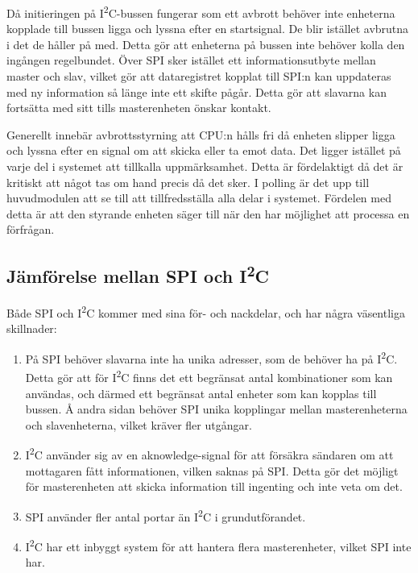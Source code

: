 \documentclass[11pt]{article}
\begin{document}
\begin{flushleft}



Då initieringen på I\textsuperscript{2}C-bussen fungerar som ett avbrott behöver inte enheterna kopplade till bussen ligga och lyssna efter en startsignal. De blir istället avbrutna i det de håller på med.\cite{guideI2C} Detta gör att enheterna på bussen inte behöver kolla den ingången regelbundet. Över SPI sker istället ett informationsutbyte mellan master och slav, vilket gör att dataregistret kopplat till SPI:n kan uppdateras med ny information så länge inte ett skifte pågår. Detta gör att slavarna kan fortsätta med sitt tills masterenheten önskar kontakt. \cite{ATMega16}

Generellt innebär avbrottsstyrning att CPU:n hålls fri då enheten slipper ligga och lyssna efter en signal om att skicka eller ta emot data. Det ligger istället på varje del i systemet att tillkalla uppmärksamhet. Detta är fördelaktigt då det är kritiskt att något tas om hand precis då det sker. I polling är det upp till huvudmodulen att se till att tillfredsställa alla delar i systemet. Fördelen med detta är att den styrande enheten säger till när den har möjlighet att processa en förfrågan. \cite{interruptPoll}

\subsection{Jämförelse mellan SPI och I\textsuperscript{2}C}
Både SPI och I\textsuperscript{2}C kommer med sina för- och nackdelar, och har några väsentliga skillnader:

\begin{enumerate}
	\item På SPI behöver slavarna inte ha unika adresser, som de behöver ha på I\textsuperscript{2}C. Detta gör att för I\textsuperscript{2}C finns det ett begränsat antal kombinationer som kan användas, och därmed ett begränsat antal enheter som kan kopplas till bussen. Å andra sidan behöver SPI unika kopplingar mellan masterenheterna och slavenheterna, vilket kräver fler utgångar.
	\item I\textsuperscript{2}C använder sig av en aknowledge-signal för att försäkra sändaren om att mottagaren fått informationen, vilken saknas på SPI. Detta gör det möjligt för masterenheten att skicka information till ingenting och inte veta om det. 
	\item SPI använder fler antal portar än I\textsuperscript{2}C i grundutförandet.
	\item I\textsuperscript{2}C har ett inbyggt system för att hantera flera masterenheter, vilket SPI inte har.
\end{enumerate}


\end{flushleft}
\end{document}
